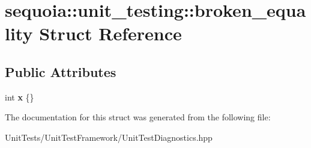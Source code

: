 \hypertarget{structsequoia_1_1unit__testing_1_1broken__equality}{}\section{sequoia\+::unit\+\_\+testing\+::broken\+\_\+equality Struct Reference}
\label{structsequoia_1_1unit__testing_1_1broken__equality}
\subsection*{Public Attributes}
\begin{DoxyCompactItemize}
\item 
\mbox{\label{structsequoia_1_1unit__testing_1_1broken__equality_a5164cd6885ecb3bb4b6f815df4479cb3}} 
int {\bfseries x} \{\}
\end{DoxyCompactItemize}


The documentation for this struct was generated from the following file\+:\begin{DoxyCompactItemize}
\item 
Unit\+Tests/\+Unit\+Test\+Framework/Unit\+Test\+Diagnostics.\+hpp\end{DoxyCompactItemize}

